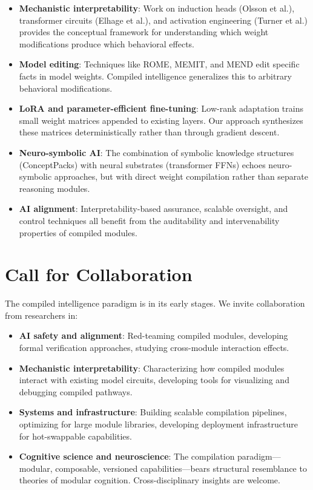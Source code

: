\documentclass[11pt,a4paper]{article}
\begin{document}
\begin{itemize}[leftmargin=*]
\item \textbf{Mechanistic interpretability}: Work on induction heads (Olsson et al.), transformer circuits (Elhage et al.), and activation engineering (Turner et al.) provides the conceptual framework for understanding which weight modifications produce which behavioral effects.
\item \textbf{Model editing}: Techniques like ROME, MEMIT, and MEND edit specific facts in model weights. Compiled intelligence generalizes this to arbitrary behavioral modifications.
\item \textbf{LoRA and parameter-efficient fine-tuning}: Low-rank adaptation trains small weight matrices appended to existing layers. Our approach synthesizes these matrices deterministically rather than through gradient descent.
\item \textbf{Neuro-symbolic AI}: The combination of symbolic knowledge structures (ConceptPacks) with neural substrates (transformer FFNs) echoes neuro-symbolic approaches, but with direct weight compilation rather than separate reasoning modules.
\item \textbf{AI alignment}: Interpretability-based assurance, scalable oversight, and control techniques all benefit from the auditability and intervenability properties of compiled modules.
\end{itemize}

\section{Call for Collaboration}

The compiled intelligence paradigm is in its early stages. We invite collaboration from researchers in:

\begin{itemize}[leftmargin=*]
\item \textbf{AI safety and alignment}: Red-teaming compiled modules, developing formal verification approaches, studying cross-module interaction effects.
\item \textbf{Mechanistic interpretability}: Characterizing how compiled modules interact with existing model circuits, developing tools for visualizing and debugging compiled pathways.
\item \textbf{Systems and infrastructure}: Building scalable compilation pipelines, optimizing for large module libraries, developing deployment infrastructure for hot-swappable capabilities.
\item \textbf{Cognitive science and neuroscience}: The compilation paradigm---modular, composable, versioned capabilities---bears structural resemblance to theories of modular cognition. Cross-disciplinary insights are welcome.
\end{itemize}
\end{document}
